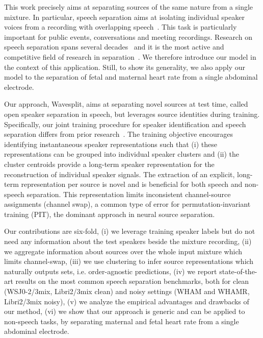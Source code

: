 \documentclass[letterpaper, onecolumn,10 pt]{IEEEtran}
\begin{document}
This work precisely aims at separating sources of the same nature from a single mixture. In particular, speech separation aims at isolating individual speaker voices from a recording with overlapping speech~\cite{vincent18book}. This task is particularly important for public events, conversations and meeting recordings. Research on speech separation spans several decades~\cite{vincent18book} and it is the most active and competitive field of research in separation~\cite{hershey16:deep_clustering, luo19:tasnet, luo2019:dualpathrnn, nachmani2020voice}. We therefore introduce our model in the context of this application. Still, to show its generality, we also apply our model to the separation of fetal and maternal heart rate from a single abdominal electrode.

Our approach, Wavesplit, aims at separating novel sources at test time, called open speaker separation in speech, but leverages source identities during training. Specifically, our joint training procedure for speaker identification and speech separation differs from prior research~\cite{wang18:voicefilter}. The training objective encourages identifying instantaneous speaker representations such that (i) these representations can be grouped into individual speaker clusters and (ii) the cluster centroids provide a long-term speaker representation for the reconstruction of individual speaker signals. The extraction of an explicit, long-term representation per source is novel and is beneficial for both speech and non-speech separation. This representation limits inconsistent channel-source assignments (channel swap), a common type of error for permutation-invariant training (PIT), the dominant approach in neural source separation.

Our contributions are six-fold, (i) we leverage training speaker labels but do not need any information about the test speakers beside the mixture recording, (ii) we aggregate information about sources over the whole input mixture which limits channel-swap, (iii) we use clustering to infer source representations which naturally outputs sets, i.e. order-agnostic predictions, (iv) we report state-of-the-art results on the most common speech separation benchmarks, both for clean (WSJ0-{2/3}mix, Libri{2/3}mix clean) and noisy settings (WHAM and WHAMR, Libri{2/3}mix noisy), (v) we analyze the empirical advantages and drawbacks of our method, (vi) we show that our approach is generic and can be applied to non-speech tasks, by separating maternal and fetal heart rate from a single abdominal electrode.
\end{document}
